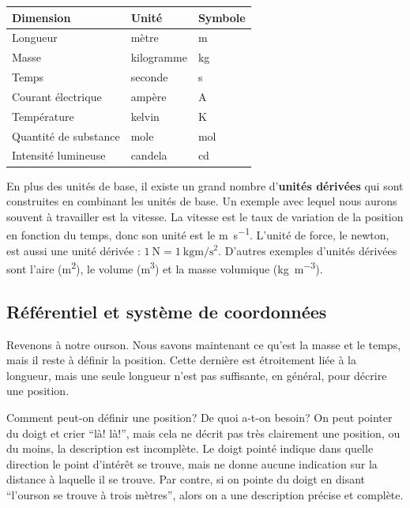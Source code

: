 \vspace{0.3cm}
\begin{tabular}{lll}
  \toprule
  Dimension              &  Unité       &  Symbole \\
  \midrule
  Longueur               &  mètre       &  m       \\
  Masse                  &  kilogramme  &  kg      \\
  Temps                  &  seconde     &  s       \\
  Courant électrique     &  ampère      &  A       \\
  Température            &  kelvin      &  K       \\
  Quantité de substance  &  mole        &  mol     \\
  Intensité lumineuse    &  candela     &  cd      \\
  \bottomrule
\end{tabular}
\vspace{0.3cm}

En plus des unités de base, il existe un grand nombre d'\textbf{unités
  dérivées} qui sont construites en combinant les unités de base.  Un exemple
avec lequel nous aurons souvent à travailler est la vitesse.  La vitesse est le
taux de variation de la position en fonction du temps, donc son unité est le
\si{\meter\per\second}.  L'unité de force, le newton, est aussi une unité
dérivée : $\SI{1}{\newton} = \SI{1}{\kilogram\meter\per\second\squared}$.
D'autres exemples d'unités dérivées sont l'aire (\si{\meter\squared}), le
volume (\si{\meter\cubed}) et la masse volumique
(\si{\kilogram\per\meter\cubed}).



\subsection{Référentiel et système de coordonnées}

Revenons à notre ourson.  Nous savons maintenant ce qu'est la masse et le
temps, mais il reste à définir la position.  Cette dernière est étroitement
liée à la longueur, mais une seule longueur n'est pas suffisante, en général,
pour décrire une position.

Comment peut-on définir une position?  De quoi a-t-on
besoin? On peut pointer du doigt et crier ``là! là!'', mais cela ne décrit pas
très clairement une position, ou du moins, la description est incomplète.  Le
doigt pointé indique dans quelle direction le point d'intérêt se trouve, mais
ne donne aucune indication sur la distance à laquelle il se trouve.  Par
contre, si on pointe du doigt en disant ``l'ourson se trouve à trois mètres'',
alors on a une description précise et complète.

